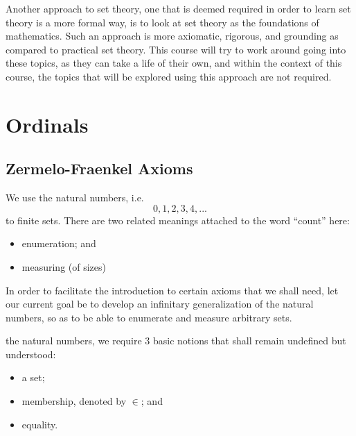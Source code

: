 \documentclass[notoc,notitlepage]{tufte-book}
\begin{document}
Another approach to set theory, one that is deemed required in order to learn set theory is a more formal way, is to look at set theory as the foundations of mathematics. Such an approach is more axiomatic, rigorous, and grounding as compared to practical set theory. This course will try to work around going into these topics, as they can take a life of their own, and within the context of this course, the topics that will be explored using this approach are not required.


\section{Ordinals}%
\label{sec:ordinals}

\subsection{Zermelo-Fraenkel Axioms}%
\label{sub:zermelo_fraenkel_axioms}

We use the natural numbers, i.e.
\begin{equation*}
  0, 1, 2, 3, 4, ...
\end{equation*}
to  finite sets. There are two related meanings attached to the word ``count'' here:
\begin{itemize}
  \item enumeration; and
  \item measuring (of sizes)
\end{itemize}

In order to facilitate the introduction to certain axioms that we shall need, let our current goal be to develop an infinitary generalization of the natural numbers, so as to be able to enumerate and measure arbitrary sets.

 the natural numbers, we require 3 basic notions that shall remain undefined but understood:
\begin{itemize}
  \item a set;
  \item membership, denoted by $\in$; and
  \item equality.
\end{itemize}
\end{document}
